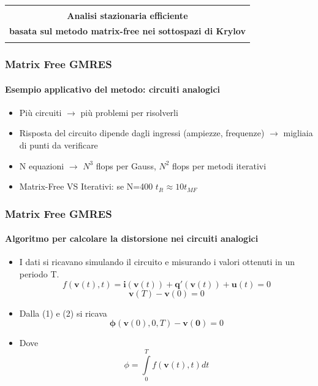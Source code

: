 \documentclass[10pt]{beamer}
\begin{document}
\begin{frame} 
\begin{center}
\begin{tabular}{ c }
\hline\\
 \textbf{Analisi stazionaria efficiente} \\ [0.5ex]
  \textbf{basata sul metodo matrix-free nei sottospazi di Krylov}\\ \\
 \hline
\end{tabular}
\end{center}
\end{frame}


\begin{frame}
\frametitle{Matrix Free GMRES}\framesubtitle{Esempio applicativo del metodo: \textbf{circuiti analogici}}
\begin{itemize}
\item Più circuiti $\to$ più problemi per risolverli
\item Risposta del circuito dipende dagli ingressi (ampiezze, frequenze) $\to$ migliaia di punti da verificare
\item N equazioni $\to$ $N^3$ flops per Gauss, $N^2$ flops per metodi iterativi
\item Matrix-Free VS Iterativi: se N=400 $t_{It} \approx 10t_{MF}$
\end{itemize}
\end{frame}


\begin{frame}
\frametitle{Matrix Free GMRES}\framesubtitle{Algoritmo per calcolare la distorsione nei circuiti analogici}
\begin{itemize}
\item I dati si ricavano simulando il circuito e misurando i valori ottenuti in un periodo T.
\begin{equation}
f(\mathbf{v}(t),t) = \mathbf{i}(\mathbf{v}(t)) + \mathbf{q}'(\mathbf{v}(t)) + \mathbf{u}(t) = 0	           
\end{equation}
\begin{equation}
\mathbf{v}(T) - \mathbf{v}(0) = 0 
\end{equation}
\item Dalla (1) e (2) si ricava  \begin{equation}
\mathbf{\phi}(\mathbf{v}(0),0,T) - \mathbf{v(0)}
 = 0
 \end{equation}
\item Dove \[ \phi = \int\limits_0^T f(\mathbf{v}(t),t) dt\]
\end{itemize}
\end{frame}
\end{document}
